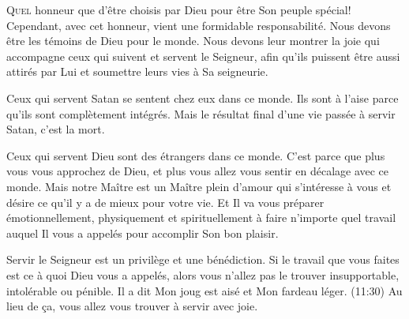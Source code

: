 \dvrule







\lettrine{Q}{uel} honneur que d'être choisis par Dieu
 pour être Son peuple spécial!
 Cependant, avec cet honneur, vient une formidable responsabilité.
 Nous devons être les témoins de Dieu pour le monde.
 Nous devons leur montrer la joie qui accompagne ceux qui suivent
 et servent le Seigneur, afin qu'ils puissent être aussi attirés par Lui
 et soumettre leurs vies à Sa seigneurie. 


Ceux qui servent Satan se sentent chez eux dans ce monde.
 Ils sont à l'aise parce qu'ils sont complètement intégrés.
 Mais le résultat final d'une vie passée à servir Satan, c'est la mort.

Ceux qui servent Dieu sont des étrangers dans ce monde.
 C'est parce que plus vous vous approchez de Dieu,
 et plus vous allez vous sentir en décalage avec ce monde.
 Mais notre Maître est un Maître plein d'amour qui s'intéresse à vous
 et désire ce qu'il y a de mieux pour votre vie.
 Et Il va vous préparer émotionnellement, physiquement et spirituellement
 à faire n'importe quel travail auquel Il vous a appelés
 pour accomplir Son bon plaisir.

Servir le Seigneur est un privilège et une bénédiction.
 Si le travail que vous faites est ce à quoi Dieu vous a appelés,
 alors vous n'allez pas le trouver insupportable, intolérable ou pénible.
 Il a dit\frcolon{} \Og Mon joug est aisé et Mon fardeau léger. \Fg{}
 (11:30)
 Au lieu de \c{c}a, vous allez vous trouver à servir avec joie. 

